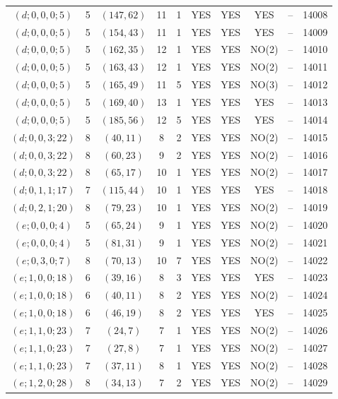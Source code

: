 \begin{longtable}{|c|c|c|c|c|c|c|c|c|c|}
$(d; 0, 0, 0; 5)$ & 5 & $(147, 62)$ & 11 & 1 & YES & YES & YES & -- & 14008\\
$(d; 0, 0, 0; 5)$ & 5 & $(154, 43)$ & 11 & 1 & YES & YES & YES & -- & 14009\\
$(d; 0, 0, 0; 5)$ & 5 & $(162, 35)$ & 12 & 1 & YES & YES & NO(2) & -- & 14010\\
$(d; 0, 0, 0; 5)$ & 5 & $(163, 43)$ & 12 & 1 & YES & YES & NO(2) & -- & 14011\\
$(d; 0, 0, 0; 5)$ & 5 & $(165, 49)$ & 11 & 5 & YES & YES & NO(3) & -- & 14012\\
$(d; 0, 0, 0; 5)$ & 5 & $(169, 40)$ & 13 & 1 & YES & YES & YES & -- & 14013\\
$(d; 0, 0, 0; 5)$ & 5 & $(185, 56)$ & 12 & 5 & YES & YES & YES & -- & 14014\\
$(d; 0, 0, 3; 22)$ & 8 & $(40, 11)$ & 8 & 2 & YES & YES & NO(2) & -- & 14015\\
$(d; 0, 0, 3; 22)$ & 8 & $(60, 23)$ & 9 & 2 & YES & YES & NO(2) & -- & 14016\\
$(d; 0, 0, 3; 22)$ & 8 & $(65, 17)$ & 10 & 1 & YES & YES & NO(2) & -- & 14017\\
$(d; 0, 1, 1; 17)$ & 7 & $(115, 44)$ & 10 & 1 & YES & YES & YES & -- & 14018\\
$(d; 0, 2, 1; 20)$ & 8 & $(79, 23)$ & 10 & 1 & YES & YES & NO(2) & -- & 14019\\
$(e; 0, 0, 0; 4)$ & 5 & $(65, 24)$ & 9 & 1 & YES & YES & NO(2) & -- & 14020\\
$(e; 0, 0, 0; 4)$ & 5 & $(81, 31)$ & 9 & 1 & YES & YES & NO(2) & -- & 14021\\
$(e; 0, 3, 0; 7)$ & 8 & $(70, 13)$ & 10 & 7 & YES & YES & NO(2) & -- & 14022\\
$(e; 1, 0, 0; 18)$ & 6 & $(39, 16)$ & 8 & 3 & YES & YES & YES & -- & 14023\\
$(e; 1, 0, 0; 18)$ & 6 & $(40, 11)$ & 8 & 2 & YES & YES & NO(2) & -- & 14024\\
$(e; 1, 0, 0; 18)$ & 6 & $(46, 19)$ & 8 & 2 & YES & YES & YES & -- & 14025\\
$(e; 1, 1, 0; 23)$ & 7 & $(24, 7)$ & 7 & 1 & YES & YES & NO(2) & -- & 14026\\
$(e; 1, 1, 0; 23)$ & 7 & $(27, 8)$ & 7 & 1 & YES & YES & NO(2) & -- & 14027\\
$(e; 1, 1, 0; 23)$ & 7 & $(37, 11)$ & 8 & 1 & YES & YES & NO(2) & -- & 14028\\
$(e; 1, 2, 0; 28)$ & 8 & $(34, 13)$ & 7 & 2 & YES & YES & NO(2) & -- & 14029\\

\end{longtable}

